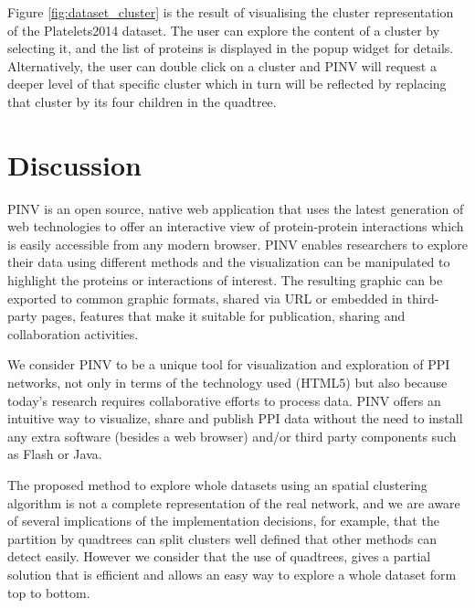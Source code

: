 \begin{description}
Figure \ref{fig:dataset_cluster} is the result of visualising the cluster representation of the Platelets2014 dataset. The user can explore the content of a cluster by selecting it, and the list of proteins is displayed in the popup widget for details. Alternatively, the user can double click on a cluster and PINV will request a deeper level of that specific cluster which in turn will be reflected by replacing that cluster by its four children in the quadtree.


\end{description}
\section{Discussion}
PINV is an open source, native web application that uses the latest generation of web technologies to offer an interactive view of protein-protein interactions which is easily accessible from any modern browser. PINV enables researchers to explore their data using different methods and the visualization can be manipulated to highlight the proteins or interactions of interest. The resulting graphic can be exported to common graphic formats, shared via URL or embedded in third-party pages, features that make it suitable for publication, sharing and collaboration activities.

We consider PINV to be a unique tool for visualization and exploration of PPI networks, not only in terms of the technology used (HTML5) but also because today's research requires collaborative efforts to process data. PINV offers an intuitive way to visualize, share and publish PPI data without the need to install any extra software (besides a web browser) and/or third party components such as Flash or Java.

The proposed method to explore whole datasets using an spatial clustering algorithm is not a complete representation of the real network, and we are aware of several implications of the implementation decisions, for example, that the partition by quadtrees can split clusters well defined that other methods can detect easily. However we consider that the use of quadtrees, gives a partial solution that is efficient and allows an easy way to explore a whole dataset form top to bottom.

